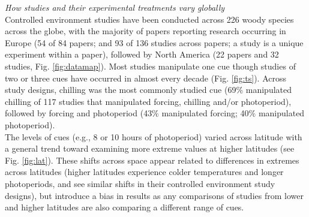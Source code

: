 \documentclass[11pt,letter]{article}
\begin{document}
\emph{How studies and their experimental treatments vary globally}\\
Controlled environment studies have been conducted across 226 woody species across the globe, with the majority of papers reporting research occurring in Europe (54 of 84 papers; and 93 of 136 studies across papers; a study is a unique experiment within a paper), followed by North America (22 papers and 32 studies, Fig. \ref{fig:datamap}). Most studies manipulate one cue though studies of two or three cues have occurred in almost every decade (Fig. \ref{fig:ts}). Across study designs, chilling was the most commonly studied cue (69\% manipulated chilling of 117 studies that manipulated forcing, chilling and/or photoperiod), followed by forcing and photoperiod (43\% manipulated forcing; 40\% manipulated photoperiod). \\

The levels of cues (e.g., 8 or 10 hours of photoperiod) varied across latitude with a general trend toward examining more extreme values at higher latitudes (see Fig. \ref{fig:lat}). These shifts across space appear related to differences in extremes across latitudes (higher latitudes experience colder temperatures and longer photoperiods, and see similar shifts in their controlled environment study designs), but introduce a bias in results as any comparisons of studies from lower and higher latitudes are also comparing a different range of cues. \\

\end{document}
